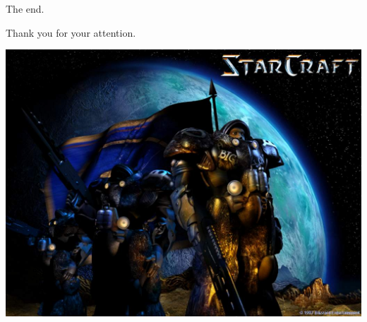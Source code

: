 \documentclass[10pt]{beamer}
\begin{document}
\begin{frame}{The end.}

Thank you for your attention. \newline

	  \begin{center}
	  \includegraphics[scale=0.2]{win.jpg}
	  \end{center}


\end{frame}
\end{document}
